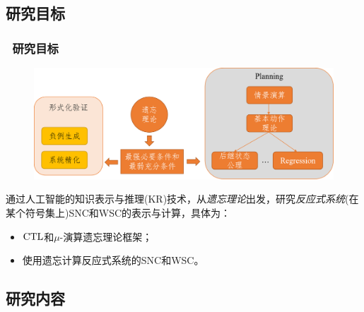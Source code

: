 \documentclass[9pt, CJK]{beamer}
\begin{document}
\subsection{研究目标}
	\begin{frame}
		\frametitle{~研究目标}
		\begin{figure}
			\includegraphics[scale=0.3]{figures/mubiao}
		\end{figure}
{\footnotesize
		通过人工智能的知识表示与推理(KR)技术，从{\em 遗忘理论}出发，研究{\em 反应式系统}(在某个符号集上)SNC和WSC的表示与计算，具体为：
		\begin{itemize}
			\item $\textrm{CTL}$和$\mu$-演算遗忘理论框架；
			\item 使用遗忘计算反应式系统的SNC和WSC。
		\end{itemize}
}
	\end{frame}

	
	\subsection{研究内容}
\end{document}
